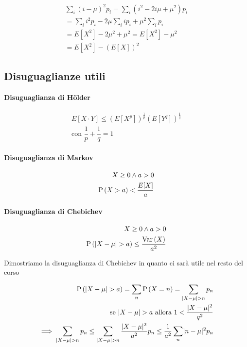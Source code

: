 \[ \begin{aligned}
\sum_i (i-\mu)^2 p_i = \sum_i (i^2 -2i\mu + \mu^2) p_i \\
= \sum_i i^2 p_i - 2\mu \sum_i i p_i + \mu^2 \sum_i p_i \\
= E[X^2] - 2\mu^2 + \mu^2 = E[X^2] - \mu^2 \\
= E[X^2] - \left(E[X]\right)^2 
\end{aligned} \]

\subsection{Disuguaglianze utili}

\paragraph{Disuguaglianza di Hölder}

\[ \begin{aligned}
E[X \cdot Y] \leq (E[X^p])^{\frac{1}{p}} (E[Y^q])^{\frac{1}{q}} \\
\text{con } \dfrac{1}{p} + \dfrac{1}{q} = 1
\end{aligned} \]

\paragraph{Disuguaglianza di Markov}

\[ \begin{aligned}
X \geq 0 \land a > 0 \\
\text{P}\left(X > a\right) < \dfrac{E[X]}{a}
\end{aligned} \]

\paragraph{Disuguaglianza di Chebichev}

\[ \begin{aligned}
X \geq 0 \land a > 0 \\
\text{P}\left(\lvert X - \mu\rvert > a\right) \leq \dfrac{\text{Var}\left(X\right)}{a^2}
\end{aligned} \]

Dimostriamo la disuguaglianza di Chebichev in quanto ci sarà utile nel resto del corso

\[ \begin{aligned}
\text{P}\left(\lvert X - \mu\rvert > a\right) = \sum_n \text{P}\left(X = n\right) = \sum_{\lvert X - \mu\rvert > n} p_n \\
\text{se } \lvert X - \mu\rvert > a \text{ allora } 1 < \dfrac{\lvert X - \mu\rvert^2}{q^2} \\ \implies  \sum_{\lvert X - \mu\rvert > n} p_n  \leq \sum_{\lvert X - \mu\rvert > n} \dfrac{\lvert X - \mu\rvert^2}{a^2} p_n \leq \dfrac{1}{a^2} \sum_n \lvert n - \mu\rvert^2 p_n 
\end{aligned} \]

